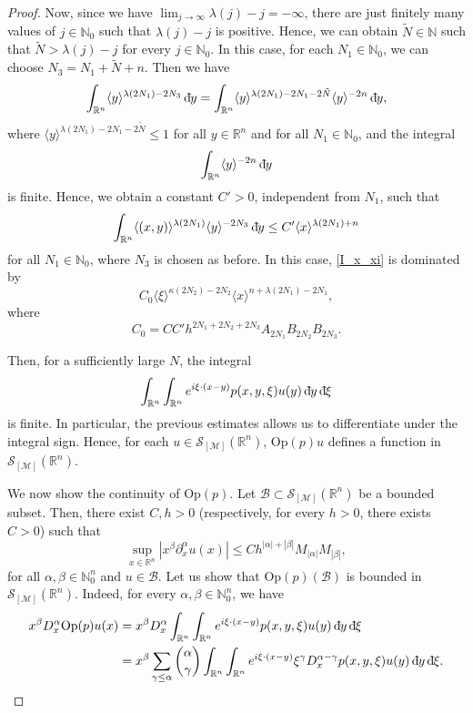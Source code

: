 \documentclass[11pt,reqno]{amsart}
\numberwithin{equation}{section}
\newcommand{\dbar}{\mathrm{d}\hspace*{-0.15em}\bar{}\hspace*{0.1em}}
\newcommand{\R}{{\mathbb{R}}} %
\newcommand{\caS}{{\mathcal{S}}}
\newcommand{\Op}{{\mathrm{Op}}}
\newcommand{\M}{{\mathcal{M}}} %
\begin{document}
\begin{proof}
	Now, since we have $\lim_{j\to\infty}\lambda(j)-j=-\infty$, there are just finitely many values of $j\in\mathbb{N}_0$ such that $\lambda(j)-j$ is positive. Hence, we can obtain $\tilde N\in\mathbb{N}$ such that $\tilde N>\lambda(j)-j$ for every $j\in\mathbb{N}_0$. In this case, for each $N_1\in\mathbb{N}_0$, we can choose $N_3=N_1+\tilde N+n$. Then we have
	\[\int_{\mathbb{R}^n}\langle y\rangle^{\lambda(2N_1)-2N_3}\,\dbar y = \int_{\mathbb{R}^n}\langle y\rangle^{\lambda(2N_1)-2N_1-2\tilde N}\langle y\rangle^{-2n}\,\dbar y,\]
	where $\langle y\rangle^{\lambda(2N_1)-2N_1-2\tilde N}\leq 1$ for all $y\in\mathbb{R}^n$ and for all $N_1\in\mathbb{N}_0$, and the integral
	\[\int_{\mathbb{R}^n}\langle y\rangle^{-2n}\,\dbar y\]
	is finite. Hence, we obtain a constant $C'>0$, independent from $N_1$, such that
	\[\int_{\mathbb{R}^n}\langle (x,y)\rangle^{\lambda(2N_1)}\langle y\rangle^{-2N_3}\,\dbar y \leq C'\langle x\rangle^{\lambda(2N_1)+n}\]
	for all $N_1\in\mathbb{N}_0$, where $N_3$ is chosen as before. In this case, \eqref{I_x_xi} is dominated by
	\begin{equation}\label{est_I}
		C_0\langle\xi\rangle^{\kappa(2N_2)-2N_2}\langle x\rangle^{n+\lambda(2N_1)-2N_1},
	\end{equation}
	where
	\[C_0 = CC'h^{2N_1+2N_2+2N_3} A_{2N_1}B_{2N_2} B_{2N_3}.\]
	
	Then, for a sufficiently large $N$, the integral
	\[\int_{\mathbb{R}^n}\int_{\mathbb{R}^n}e^{i\xi\cdot(x-y)}p(x,y,\xi)u(y)\,\dbar y\,\dbar\xi\]
	is finite. In particular, the previous estimates allows us to differentiate under the integral sign. Hence, for each $u\in\caS_{[\M]}(\R^n)$, $\Op(p)u$ defines a function in $\caS_{[\M]}(\R^n)$.
	
	We now show the continuity of $\Op(p)$. Let $\mathscr{B}\subset\caS_{[\M]}(\R^n)$ be a bounded subset. Then, there exist $C,h>0$ (respectively, for every $h>0$, there exists $C>0$) such that
	\[\sup_{x\in\R^n}|x^\beta\partial_x^\alpha u(x)|\leq Ch^{|\alpha|+|\beta|}M_{|\alpha|}M_{|\beta|},\]
	for all $\alpha,\beta\in\mathbb{N}_0^n$ and $u\in\mathscr{B}$. Let us show that $\mathrm{Op}(p)(\mathscr{B})$ is bounded in $\mathcal{S}_{[\M]}(\mathbb{R}^n)$. Indeed, for every $\alpha,\beta\in\mathbb{N}_0^n$, we have
	\begin{align*}
		x^\beta D_x^\alpha\mathrm{Op}(p)u(x) & = x^\beta D_x^\alpha\int_{\mathbb{R}^n}\int_{\mathbb{R}^n}e^{i\xi\cdot (x-y)}p(x,y,\xi) u(y)\,\dbar y\,\dbar\xi\\
		& = x^\beta\sum_{\gamma\leq\alpha}\binom{\alpha}{\gamma} \int_{\mathbb{R}^n} \int_{\mathbb{R}^n} e^{i\xi\cdot (x-y)}\xi^\gamma D_x^{\alpha-\gamma}p(x,y,\xi) u(y)\,\dbar y\,\dbar\xi.
	\end{align*}
	

\end{proof}
\end{document}
